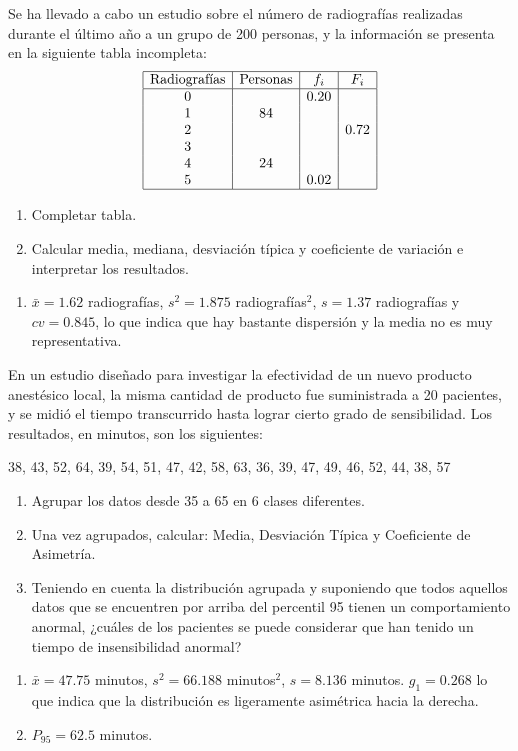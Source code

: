 {Se ha llevado a cabo un estudio sobre el número de radiografías realizadas durante el último año a un grupo de 200 personas, y la información se presenta en la siguiente tabla incompleta:
\[
\begin{array}{|c|c|c|c|}
\hline
\mbox{Radiografías} & \mbox{Personas} & f_i & F_i \\
\hline
0 &    & 0.20 &      \\
1 & 84 &      &      \\
2 &    &      & 0.72 \\
3 &    &      &      \\
4 & 24 &      &      \\
5 &    & 0.02 &      \\
\hline
\end{array}
\]
\begin{enumerate}
\item Completar tabla.
\item Calcular media, mediana, desviación típica y coeficiente de variación e interpretar los resultados.
\end{enumerate}
}
{\begin{enumerate}[start=2]
\item $\bar x= 1.62$ radiografías, $s^2=1.875$ radiografías$^2$, $s=1.37$ radiografías y $cv=0.845$, lo que indica que hay bastante dispersión y la media no es muy representativa.
\end{enumerate}
}
{}


{En un estudio diseñado para investigar la efectividad de un nuevo producto anestésico local, la misma cantidad de producto fue suministrada a 20 pacientes, y se midió el tiempo transcurrido hasta lograr cierto grado de sensibilidad. Los resultados, en minutos, son los siguientes:
\begin{center}
38, 43, 52, 64, 39, 54, 51, 47, 42, 58, 63, 36, 39, 47, 49, 46, 52, 44, 38, 57
\end{center}
\begin{enumerate}
\item Agrupar los datos desde 35 a 65 en 6 clases diferentes.
\item Una vez agrupados, calcular: Media, Desviación Típica y Coeficiente de Asimetría.
\item Teniendo en cuenta la distribución agrupada y suponiendo que todos aquellos datos que se encuentren por arriba del percentil 95 tienen un comportamiento anormal, ¿cuáles de los pacientes se puede considerar que han tenido un tiempo de insensibilidad anormal?
\end{enumerate}
}
{\begin{enumerate}[start=2]
\item $\bar x= 47.75$ minutos, $s^2=66.188$ minutos$^2$, $s=8.136$ minutos. $g_1=0.268$ lo que indica que la distribución es ligeramente asimétrica hacia la derecha.
\item $P_{95}=62.5$ minutos.
\end{enumerate}
}
{}


